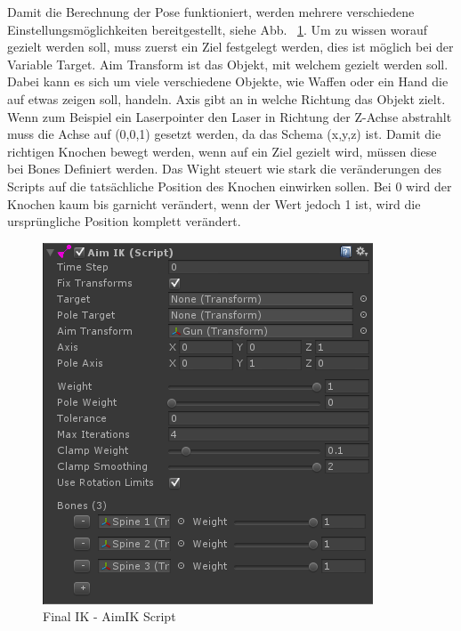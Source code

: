 Damit die Berechnung der Pose funktioniert, werden mehrere verschiedene Einstellungsmöglichkeiten bereitgestellt, siehe Abb. ~\ref{fig:finalIK_aimIK_script}.
Um zu wissen worauf gezielt werden soll, muss zuerst ein Ziel festgelegt werden, dies ist möglich bei der Variable Target.
Aim Transform ist das Objekt, mit welchem gezielt werden soll.
Dabei kann es sich um viele verschiedene Objekte, wie Waffen oder ein Hand die auf etwas zeigen soll, handeln.
Axis gibt an in welche Richtung das Objekt zielt.
Wenn zum Beispiel ein Laserpointer den Laser in Richtung der Z-Achse abstrahlt muss die Achse auf (0,0,1) gesetzt werden, da das Schema (x,y,z) ist.
Damit die richtigen Knochen bewegt werden, wenn auf ein Ziel gezielt wird, müssen diese bei Bones Definiert werden.
Das Wight steuert wie stark die veränderungen des Scripts auf die tatsächliche Position des Knochen einwirken sollen.
Bei 0 wird der Knochen kaum bis garnicht verändert, wenn der Wert jedoch 1 ist, wird die ursprüngliche Position komplett verändert.
\begin {figure}
    \centering
    \includegraphics[scale=0.7]{pics/finalik_aimik_script}
    \caption{Final IK - AimIK Script}
    \label{fig:finalIK_aimIK_script}
\end {figure}
~\cite{FinalIK_AimIK_2021}

